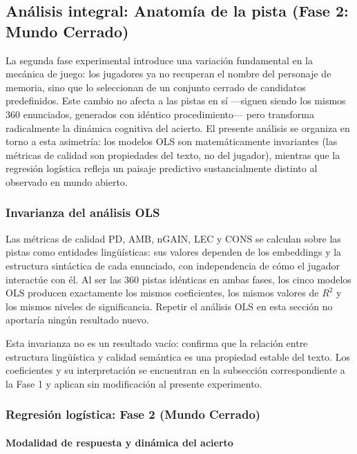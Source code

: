 \subsection{Análisis integral: Anatomía de la pista (Fase 2: Mundo Cerrado)}

La segunda fase experimental introduce una variación fundamental en la mecánica de juego: los jugadores ya no recuperan el nombre del personaje de memoria, sino que lo seleccionan de un conjunto cerrado de candidatos predefinidos. Este cambio no afecta a las pistas en sí —siguen siendo los mismos 360 enunciados, generados con idéntico procedimiento— pero transforma radicalmente la dinámica cognitiva del acierto. El presente análisis se organiza en torno a esta asimetría: los modelos OLS son matemáticamente invariantes (las métricas de calidad son propiedades del texto, no del jugador), mientras que la regresión logística refleja un paisaje predictivo sustancialmente distinto al observado en mundo abierto.

\subsubsection{Invarianza del análisis OLS}

Las métricas de calidad PD, AMB, nGAIN, LEC y CONS se calculan sobre las pistas como entidades lingüísticas: sus valores dependen de los embeddings y la estructura sintáctica de cada enunciado, con independencia de cómo el jugador interactúe con él. Al ser las 360 pistas idénticas en ambas fases, los cinco modelos OLS producen exactamente los mismos coeficientes, los mismos valores de $R^2$ y los mismos niveles de significancia. Repetir el análisis OLS en esta sección no aportaría ningún resultado nuevo.

Esta invarianza no es un resultado vacío: confirma que la relación entre estructura lingüística y calidad semántica es una propiedad estable del texto. Los coeficientes y su interpretación se encuentran en la subsección correspondiente a la Fase 1 y aplican sin modificación al presente experimento.

\subsubsection{Regresión logística: Fase 2 (Mundo Cerrado)}

\paragraph{Modalidad de respuesta y dinámica del acierto}

